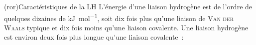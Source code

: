 \documentclass[../../main/main.tex]{subfiles}
\begin{document}
\begin{tcb*}(ror){Caractéristiques de la LH}
	L'énergie d'une liaison hydrogène est de l'ordre de quelques dizaines de
	\si{kJ.mol^{-1}}, soit dix fois plus qu'une liaison de \textsc{Van der
		Waals} typique et dix fois moins qu'une liaison covalente.
	Une liaison hydrogène est environ deux fois plus longue qu'une liaison
	covalente~:
	\vspace{-15pt}
\end{tcb*}
\end{document}
